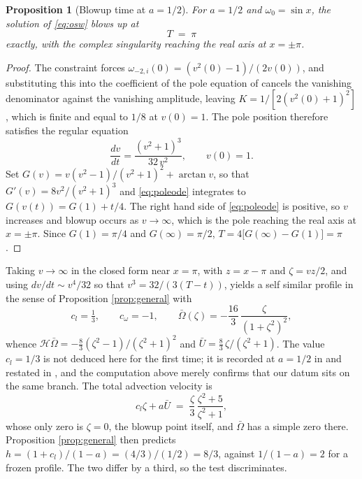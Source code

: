 \documentclass[11pt]{article}
\newtheorem{proposition}{Proposition}
\theoremstyle{definition}
\newcommand{\Hil}{\mathcal{H}}
\newcommand{\Ub}{\bar{U}}
\newcommand{\Ob}{\bar{\Omega}}
\begin{document}
\begin{proposition}[Blowup time at $a=1/2$]
\label{prop:pi}
For $a=1/2$ and $\omega_0 = \sin x$, the solution of \eqref{eq:osw} blows up at
\begin{equation}
  T \;=\; \pi
  \label{eq:Tpi}
\end{equation}
exactly, with the complex singularity reaching the real axis at $x=\pm\pi$.
\end{proposition}

\begin{proof}
The constraint forces $\omega_{-2,i}(0) = (v^2(0)-1)/(2v(0))$, and substituting
this into the coefficient of the pole equation of \cite{slsa2025} cancels the
vanishing denominator against the vanishing amplitude, leaving
$K = 1/[2(v^2(0)+1)^2]$, which is finite and equal to $1/8$ at $v(0)=1$. The
pole position therefore satisfies the regular equation
\begin{equation}
  \frac{dv}{dt} = \frac{(v^2+1)^3}{32\,v^2},\qquad v(0)=1 .
  \label{eq:poleode}
\end{equation}
Set $G(v) = v(v^2-1)/(v^2+1)^2 + \arctan v$, so that
$G'(v) = 8v^2/(v^2+1)^3$ and \eqref{eq:poleode} integrates to
$G(v(t)) = G(1) + t/4$. The right hand side of \eqref{eq:poleode} is positive,
so $v$ increases and blowup occurs as $v\to\infty$, which is the pole reaching
the real axis at $x=\pm\pi$. Since $G(1)=\pi/4$ and $G(\infty)=\pi/2$,
$T = 4\big[G(\infty)-G(1)\big] = \pi$.
\end{proof}

Taking $v\to\infty$ in the closed form near $x=\pi$, with $z = x-\pi$ and
$\zeta = vz/2$, and using $dv/dt \sim v^4/32$ so that $v^3 = 32/(3(T-t))$,
yields a self similar profile in the sense of Proposition \ref{prop:general}
with
\begin{equation}
  c_l = \tfrac13,\qquad c_\omega = -1,\qquad
  \Ob(\zeta) = -\frac{16}{3}\,\frac{\zeta}{(1+\zeta^2)^2},
  \label{eq:halfprofile}
\end{equation}
whence $\Hil\Ob = -\tfrac83(\zeta^2-1)/(\zeta^2+1)^2$ and
$\Ub = \tfrac83\,\zeta/(\zeta^2+1)$. The value $c_l = 1/3$ is not deduced here
for the first time; it is recorded at $a=1/2$ in \cite{lss2020} and restated in
\cite{slsa2025}, and the computation above merely confirms that our datum sits
on the same branch. The total advection velocity is
\begin{equation}
  c_l\zeta + a\Ub \;=\; \frac{\zeta}{3}\,\frac{\zeta^2+5}{\zeta^2+1},
  \label{eq:halfadv}
\end{equation}
whose only zero is $\zeta=0$, the blowup point itself, and $\Ob$ has a simple
zero there. Proposition \ref{prop:general} then predicts
$h = (1+c_l)/(1-a) = (4/3)/(1/2) = 8/3$, against $1/(1-a) = 2$ for a frozen
profile. The two differ by a third, so the test discriminates.
\end{document}
